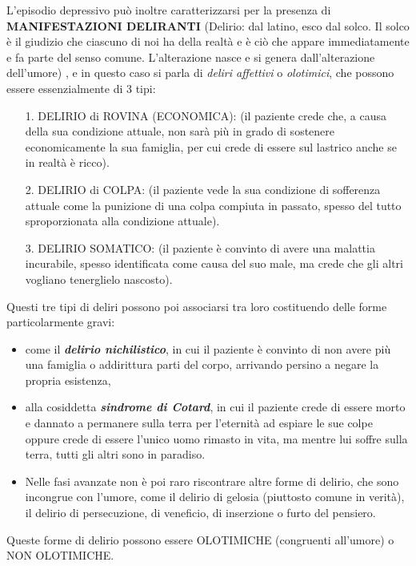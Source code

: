 L'episodio depressivo può inoltre caratterizzarsi per la presenza di
\textbf{MANIFESTAZIONI DELIRANTI} (Delirio: dal latino, esco dal solco.
Il solco è il giudizio che ciascuno di noi ha della realtà e è ciò che
appare immediatamente e fa parte del senso comune. L'alterazione nasce e
si genera dall'alterazione dell'umore) , e in questo caso si parla di
\emph{deliri affettivi} o \emph{olotimici}, che possono essere
essenzialmente di 3 tipi:

\begin{itemize}
\item[1.]
  DELIRIO di ROVINA (ECONOMICA): (il paziente crede che, a causa della
  sua condizione attuale, non sarà più in grado di sostenere
  economicamente la sua famiglia, per cui crede di essere sul lastrico
  anche se in realtà è ricco).
\item[2.]
  DELIRIO di COLPA: (il paziente vede la sua condizione di sofferenza
  attuale come la punizione di una colpa compiuta in passato, spesso del
  tutto sproporzionata alla condizione attuale).
\item[3.]
  DELIRIO SOMATICO: (il paziente è convinto di avere una malattia
  incurabile, spesso identificata come causa del suo male, ma crede che
  gli altri vogliano tenerglielo nascosto).
\end{itemize}

Questi tre tipi di deliri possono poi associarsi tra loro costituendo
delle forme particolarmente gravi:

\begin{itemize}
\item
  come il \textbf{\emph{delirio nichilistico}}, in cui il paziente è
  convinto di non avere più una famiglia o addirittura parti del corpo,
  arrivando persino a negare la propria esistenza,
\item
  alla cosiddetta \textbf{\emph{sindrome di Cotard}}, in cui il paziente
  crede di essere morto e dannato a permanere sulla terra per l'eternità
  ad espiare le sue colpe oppure crede di essere l'unico uomo rimasto in
  vita, ma mentre lui soffre sulla terra, tutti gli altri sono in
  paradiso.
\item
  Nelle fasi avanzate non è poi raro riscontrare altre forme di delirio,
  che sono incongrue con l'umore, come il delirio di gelosia (piuttosto
  comune in verità), il delirio di persecuzione, di veneficio, di
  inserzione o furto del pensiero.
\end{itemize}

Queste forme di delirio possono essere OLOTIMICHE (congruenti all'umore)
o NON OLOTIMICHE.

